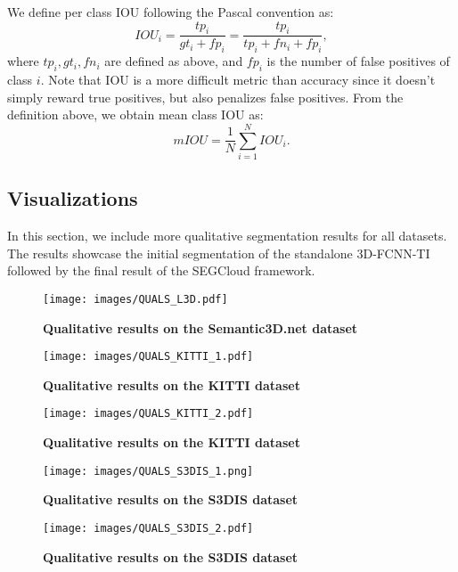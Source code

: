 \documentclass[10pt,twocolumn,letterpaper]{article}
\newcommand{\ours}[0]{SEGCloud\xspace}
\newcommand{\threedfcnn}[0]{3D-FCNN\xspace}
\begin{document}
We define per class IOU following the Pascal convention as:
\begin{equation}
    IOU_i = \frac{tp_i}{gt_i + fp_i}  = \frac{tp_i}{tp_i + fn_i + fp_i},
\end{equation}
where $tp_i, gt_i, fn_i$ are defined as above, and $fp_i$ is the number of false positives of class $i$. Note that IOU is a more difficult metric than accuracy since it doesn't simply reward true positives, but also penalizes false positives. From the definition above, we obtain mean class IOU as:
\begin{equation}
    mIOU = \frac{1}{N}\sum_{i=1}^{N}IOU_i.
\end{equation}

\vspace{5mm}
\subsection{Visualizations}\label{sec:visualizations}
In this section, we include more qualitative segmentation results for all datasets. The results showcase the initial segmentation of the standalone \threedfcnn-TI followed by the final result of the \ours framework. 


\begin{figure*}
\centering
\texttt{[image: images/QUALS\_L3D.pdf]}
\caption{\small{\textbf{Qualitative results on the Semantic3D.net dataset}}}
\label{fig:quals_l3d}
\end{figure*}

\begin{figure*}
\centering
\texttt{[image: images/QUALS\_KITTI\_1.pdf]}
\caption{\small{\textbf{Qualitative results on the KITTI dataset}}}
\label{fig:quals_kitti_1}
\end{figure*}

\begin{figure*}
\centering
\texttt{[image: images/QUALS\_KITTI\_2.pdf]}
\caption{\small{\textbf{Qualitative results on the KITTI dataset}}}
\label{fig:quals_kitti_2}
\end{figure*}

\begin{figure*}
\centering
\texttt{[image: images/QUALS\_S3DIS\_1.png]}
\caption{\small{\textbf{Qualitative results on the S3DIS dataset}}}
\label{fig:quals_s3dis_1}
\end{figure*}

\begin{figure*}
\centering
\texttt{[image: images/QUALS\_S3DIS\_2.pdf]}
\caption{\small{\textbf{Qualitative results on the S3DIS dataset}}}
\label{fig:quals_s3dis_2}
\end{figure*}
\end{document}

